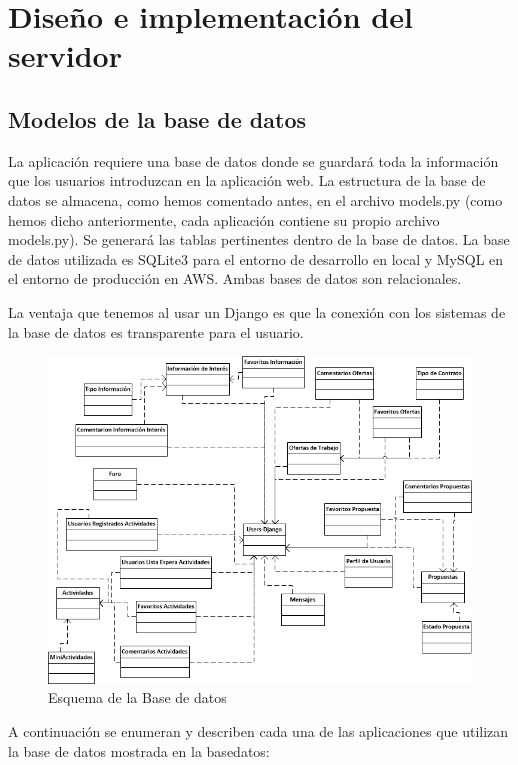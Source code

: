 \section{Diseño e implementación del servidor} 
\label{sec:servidor}


\subsection{Modelos de la base de datos} 
\label{subsec:modelos}


La aplicación requiere una base de datos donde se guardará toda la información que los usuarios introduzcan en la aplicación web. La estructura de la base de datos se almacena, como hemos comentado antes, en el archivo models.py (como hemos dicho anteriormente, cada aplicación contiene su propio archivo models.py). Se generará las tablas pertinentes dentro de la base de datos. La base de datos utilizada es SQLite3 para el entorno de desarrollo en local y MySQL en el entorno de producción en AWS. Ambas bases de datos son relacionales.


La ventaja que tenemos al usar un Django es que la conexión con los sistemas de la base de datos es transparente para el usuario. 

 \begin{figure}[H]
    \centering
    \includegraphics[width=12cm]{img/bbdd}
    \caption{Esquema de la Base de datos}
    \label{figura:basedatos}
 \end{figure}


 

A continuación se enumeran y describen cada una de las aplicaciones que utilizan la base de datos mostrada en la \figurename{basedatos}:


